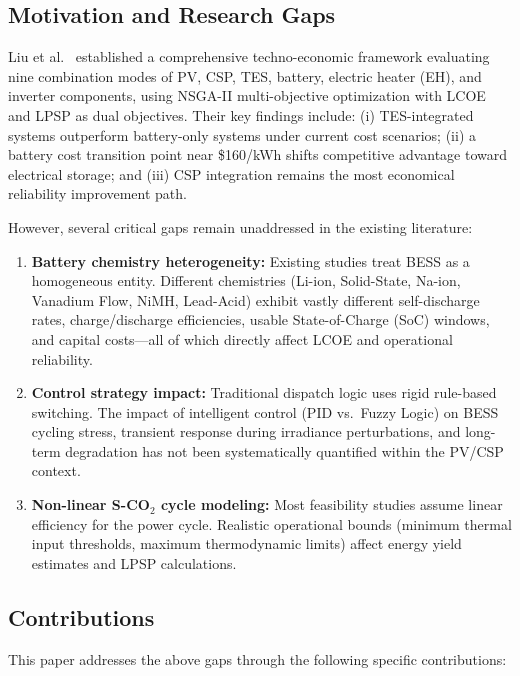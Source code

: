 \documentclass[journal]{IEEEtran}
\begin{document}
\subsection{Motivation and Research Gaps}

Liu et al.~\cite{liu2022} established a comprehensive techno-economic framework evaluating nine combination modes of PV, CSP, TES, battery, electric heater (EH), and inverter components, using NSGA-II multi-objective optimization with LCOE and LPSP as dual objectives. Their key findings include: (i) TES-integrated systems outperform battery-only systems under current cost scenarios; (ii) a battery cost transition point near \$160/kWh shifts competitive advantage toward electrical storage; and (iii) CSP integration remains the most economical reliability improvement path.

However, several critical gaps remain unaddressed in the existing literature:

\begin{enumerate}
    \item \textbf{Battery chemistry heterogeneity:} Existing studies treat BESS as a homogeneous entity. Different chemistries (Li-ion, Solid-State, Na-ion, Vanadium Flow, NiMH, Lead-Acid) exhibit vastly different self-discharge rates, charge/discharge efficiencies, usable State-of-Charge (SoC) windows, and capital costs---all of which directly affect LCOE and operational reliability.
    \item \textbf{Control strategy impact:} Traditional dispatch logic uses rigid rule-based switching. The impact of intelligent control (PID vs.\ Fuzzy Logic) on BESS cycling stress, transient response during irradiance perturbations, and long-term degradation has not been systematically quantified within the PV/CSP context.
    \item \textbf{Non-linear S-CO$_2$ cycle modeling:} Most feasibility studies assume linear efficiency for the power cycle. Realistic operational bounds (minimum thermal input thresholds, maximum thermodynamic limits) affect energy yield estimates and LPSP calculations.
\end{enumerate}

\subsection{Contributions}

This paper addresses the above gaps through the following specific contributions:
\end{document}
